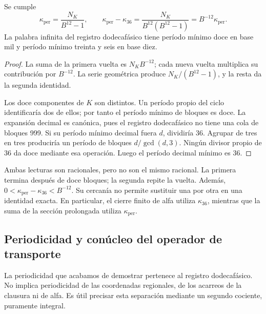 \begin{proposition}
\label{prop:k-periodo}
Se cumple
\begin{equation}
 \kappa_{\mathrm{per}}=\frac{N_K}{B^{12}-1},\qquad
 \kappa_{\mathrm{per}}-\kappa_{36}
 =\frac{N_K}{B^{12}(B^{12}-1)}
 =B^{-12}\kappa_{\mathrm{per}}.
 \label{eq:k-diferencia-kappas}
\end{equation}
La palabra infinita del registro dodecafásico tiene período mínimo doce en base mil y
período mínimo treinta y seis en base diez.
\end{proposition}

\begin{proof}
La suma de la primera vuelta es \(N_KB^{-12}\); cada nueva vuelta
multiplica su contribución por \(B^{-12}\). La serie geométrica produce
\(N_K/(B^{12}-1)\), y la resta da la segunda identidad.

Los doce componentes de \(K\) son distintos. Un período propio del ciclo
identificaría dos de ellos; por tanto el período mínimo de bloques es
doce. La expansión decimal es canónica, pues el registro dodecafásico no tiene una cola
de bloques 999. Si su período mínimo decimal fuera \(d\), dividiría
36. Agrupar de tres en tres produciría un período de bloques
\(d/\gcd(d,3)\). Ningún divisor propio de 36 da doce mediante esa
operación. Luego el período decimal mínimo es 36.
\end{proof}

Ambas lecturas son racionales, pero no son el mismo racional. La primera
termina después de doce bloques; la segunda repite la vuelta. Además,
\(0<\kappa_{\mathrm{per}}-\kappa_{36}<B^{-12}\). Su cercanía no
permite sustituir una por otra en una identidad exacta. En particular,
el cierre finito de alfa utiliza \(\kappa_{36}\), mientras que la
suma de la sección prolongada utiliza \(\kappa_{\mathrm{per}}\).



\subsection{Periodicidad y conúcleo del operador de transporte}
\label{subsec:k-clase-acarreo}

La periodicidad que acabamos de demostrar pertenece al registro dodecafásico. No implica
periodicidad de las coordenadas regionales, de los acarreos de la clausura
ni de alfa. Es útil precisar esta separación mediante un segundo
cociente, puramente integral.

